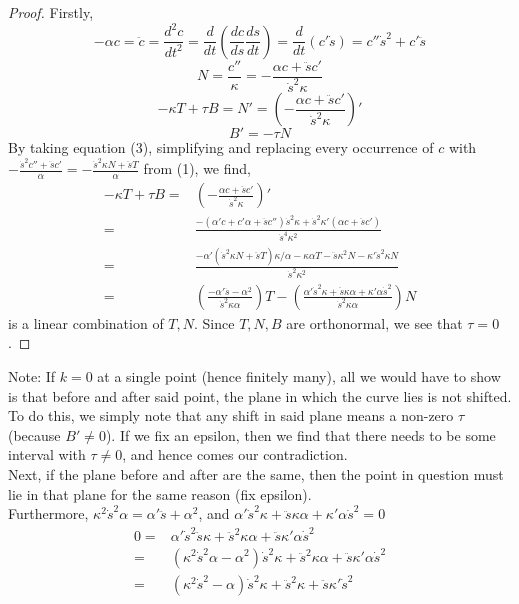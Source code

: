 \documentclass[12pt]{amsart}
\begin{document}
\begin{proof}
Firstly,
\begin{equation}
	-\alpha c=\ddot c=\frac{d^2c}{dt^2}=\frac{d}{dt}\left(\frac{dc}{ds}\frac{ds}{dt}\right)=\frac{d}{dt}\left(c'\dot s\right)=c''\dot s^2+c'\ddot s%
\end{equation}
\begin{equation}
	N=\frac{c''}{\kappa}=-\frac{\alpha c+\ddot sc'}{\dot s^2\kappa}
\end{equation}
\begin{equation}
	-\kappa T+\tau B=N'=\left(-\frac{\alpha c+\ddot sc'}{\dot s^2\kappa}\right)'
\end{equation}
\begin{equation}
	B'=-\tau N
\end{equation}
By taking equation (3), simplifying and replacing every occurrence of $c$ with $-\frac{\dot s^2c''+\ddot sc'}{\alpha}=-\frac{\dot s^2\kappa N+\ddot sT}{\alpha}$ from (1), we find, 
\begin{align*}
	-\kappa T+\tau B=&\left(-\frac{\alpha c+\ddot sc'}{\dot s^2\kappa}\right)'
	\\=&\frac{-(\alpha'c+c'\alpha+\ddot sc'')\dot s^2\kappa+\dot s^2\kappa'(\alpha c+\ddot sc')}{\dot s^4\kappa^2}
	\\=&\frac{-\alpha'(\dot s^2\kappa N+\ddot sT)\kappa/\alpha-\kappa\alpha T-\ddot s\kappa^2N-\kappa'\dot s^2\kappa N}{\dot s^2\kappa^2}
	\\=&\left(\frac{-\alpha'\ddot s-\alpha^2}{\dot s^2\kappa\alpha}\right)T-\left(\frac{\alpha'\dot s^2\kappa+\ddot s\kappa\alpha+\kappa'\alpha\dot s^2}{\dot s^2\kappa\alpha}\right)N
\end{align*}
is a linear combination of $T, N$. Since $T,N,B$ are orthonormal, we see that $\tau=0$.
\end{proof}
Note: If $k=0$ at a single point (hence finitely many), all we would have to show is that before and after said point, the plane in which the curve lies is not shifted. To do this, we simply note that any shift in said plane means a non-zero $\tau$ (because $B'\neq0$). If we fix an epsilon, then we find that there needs to be some interval with $\tau\neq0$, and hence comes our contradiction.
\\Next, if the plane before and after are the same, then the point in question must lie in that plane for the same reason (fix epsilon).
\\Furthermore, $\kappa^2\dot s^2\alpha=\alpha'\ddot s+\alpha^2$, and $\alpha'\dot s^2\kappa+\ddot s\kappa\alpha+\kappa'\alpha\dot s^2=0$
\begin{align*}
	0=&\alpha'\dot s^2\ddot s\kappa+\ddot s^2\kappa\alpha+\ddot s\kappa'\alpha\dot s^2
	\\=&(\kappa^2\dot s^2\alpha-\alpha^2)\dot s^2\kappa+\ddot s^2\kappa\alpha+\ddot s\kappa'\alpha\dot s^2
	\\=&(\kappa^2\dot s^2-\alpha)\dot s^2\kappa+\ddot s^2\kappa+\ddot s\kappa'\dot s^2
\end{align*}
\end{document}
